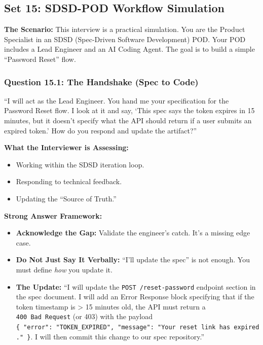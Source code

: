 \bigskip

\subsection{Set 15: SDSD-POD Workflow
Simulation}\label{set-15-sdsd-pod-workflow-simulation}

\textbf{The Scenario:} This interview is a practical simulation. You are
the Product Specialist in an SDSD (Spec-Driven Software Development)
POD. Your POD includes a Lead Engineer and an AI Coding Agent. The goal
is to build a simple ``Password Reset'' flow.

\subsubsection{Question 15.1: The Handshake (Spec to
Code)}\label{question-15.1-the-handshake-spec-to-code}

``I will act as the Lead Engineer. You hand me your specification for
the Password Reset flow. I look at it and say, `This spec says the token
expires in 15 minutes, but it doesn't specify what the API should return
if a user submits an expired token.' How do you respond and update the
artifact?''

\textbf{What the Interviewer is Assessing:}

\begin{itemize}
\tightlist
\item
  Working within the SDSD iteration loop.
\item
  Responding to technical feedback.
\item
  Updating the ``Source of Truth.''
\end{itemize}

\textbf{Strong Answer Framework:}

\begin{itemize}
\tightlist
\item
  \textbf{Acknowledge the Gap:} Validate the engineer's catch. It's a
  missing edge case.
\item
  \textbf{Do Not Just Say It Verbally:} ``I'll update the spec'' is not
  enough. You must define \emph{how} you update it.
\item
  \textbf{The Update:} ``I will update the
  \texttt{POST\ /reset-password} endpoint section in the spec document.
  I will add an Error Response block specifying that if the token
  timestamp is \textgreater{} 15 minutes old, the API must return a
  \texttt{400\ Bad\ Request} (or 403) with the payload
  \texttt{\{\ "error":\ "TOKEN\_EXPIRED",\ "message":\ "Your\ reset\ link\ has\ expired."\ \}}.
  I will then commit this change to our spec repository.''
\end{itemize}

